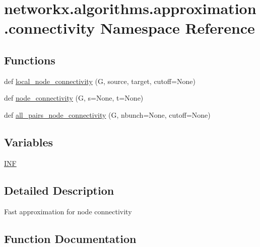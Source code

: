 \hypertarget{namespacenetworkx_1_1algorithms_1_1approximation_1_1connectivity}{}\section{networkx.\+algorithms.\+approximation.\+connectivity Namespace Reference}
\label{namespacenetworkx_1_1algorithms_1_1approximation_1_1connectivity}
\subsection*{Functions}
\begin{DoxyCompactItemize}
\item 
def \hyperlink{namespacenetworkx_1_1algorithms_1_1approximation_1_1connectivity_a8a4c09af96899a72f9ce090bad755c7c}{local\+\_\+node\+\_\+connectivity} (G, source, target, cutoff=None)
\item 
def \hyperlink{namespacenetworkx_1_1algorithms_1_1approximation_1_1connectivity_ae14f54cbac9e4b263ebce3144ff845bf}{node\+\_\+connectivity} (G, s=None, t=None)
\item 
def \hyperlink{namespacenetworkx_1_1algorithms_1_1approximation_1_1connectivity_a0087ae8cd6af1574da15c6767fb24893}{all\+\_\+pairs\+\_\+node\+\_\+connectivity} (G, nbunch=None, cutoff=None)
\end{DoxyCompactItemize}
\subsection*{Variables}
\begin{DoxyCompactItemize}
\item 
\hyperlink{namespacenetworkx_1_1algorithms_1_1approximation_1_1connectivity_aa5b25211f6bd4db33a1028266ec1aa4b}{I\+NF}
\end{DoxyCompactItemize}


\subsection{Detailed Description}
\begin{DoxyVerb}Fast approximation for node connectivity
\end{DoxyVerb}
 

\subsection{Function Documentation}
\mbox{\label{namespacenetworkx_1_1algorithms_1_1approximation_1_1connectivity_a0087ae8cd6af1574da15c6767fb24893}} 
